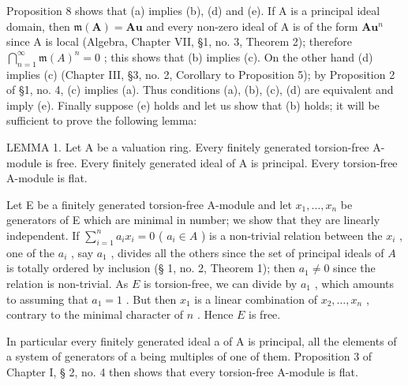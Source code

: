 Proposition 8 shows that (a) implies (b), (d) and (e). If A is a principal ideal domain, then \(\mathfrak{m}(\mathbf{A}) = \mathbf{A}\mathbf{u}\) and every non-zero ideal of A is of the form \(\mathbf{A}\mathbf{u}^n\) since A is local (Algebra, Chapter VII, §1, no. 3, Theorem 2); therefore \(\bigcap_{n=1}^{\infty} \mathfrak{m}(A)^n = 0\) ; this shows that (b) implies (c). On the other hand (d) implies (c) (Chapter III, §3, no. 2, Corollary to Proposition 5); by Proposition 2 of §1, no. 4, (c) implies (a). Thus conditions (a), (b), (c), (d) are equivalent and imply (e). Finally suppose (e) holds and let us show that (b) holds; it will be sufficient to prove the following lemma:

LEMMA 1. Let A be a valuation ring. Every finitely generated torsion-free A-module is free. Every finitely generated ideal of A is principal. Every torsion-free A-module is flat.

Let E be a finitely generated torsion-free A-module and let \(x_{1}, \ldots, x_{n}\) be generators of E which are minimal in number; we show that they are linearly independent. If \(\sum_{i=1}^{n} a_i x_i = 0\) ( \(a_i \in A\) ) is a non-trivial relation between the \(x_i\) , one of the \(a_i\) , say \(a_1\) , divides all the others since the set of principal ideals of \(A\) is totally ordered by inclusion (§ 1, no. 2, Theorem 1); then \(a_1 \neq 0\) since the relation is non-trivial. As \(E\) is torsion-free, we can divide by \(a_1\) , which amounts to assuming that \(a_1 = 1\) . But then \(x_1\) is a linear combination of \(x_2, \ldots, x_n\) , contrary to the minimal character of \(n\) . Hence \(E\) is free.

In particular every finitely generated ideal a of A is principal, all the elements of a system of generators of a being multiples of one of them. Proposition 3 of Chapter I, § 2, no. 4 then shows that every torsion-free A-module is flat.

